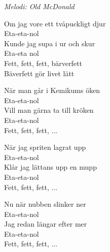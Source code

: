 {\footnotesize\textit{Melodi: Old McDonald}}\par
\vspace{10pt}
Om jag vore ett tvåpuckligt djur\\
Eta-eta-nol\\
Kunde jag supa i ur och skur\\
Eta-eta nol\\
Fett, fett, fett, bärverfett\\
Bäverfett gör livet lätt\par
\vspace{10pt}
När man går i Kemikums öken\\
Eta-eta-nol\\
Vill man gärna ta till kröken\\
Eta-eta-nol\\
Fett, fett, fett, ...\par
\vspace{10pt}
När jag spriten lagrat upp\\
Eta-eta-nol\\
Klår jag lättans upp en mupp\\
Eta-eta-nol\\
Fett, fett, fett, ...\par
\vspace{10pt}
Nu när nubben slinker ner\\
Eta-eta-nol\\
Jag redan längar efter mer\\
Eta-eta-nol\\
Fett, fett, fett, ...
